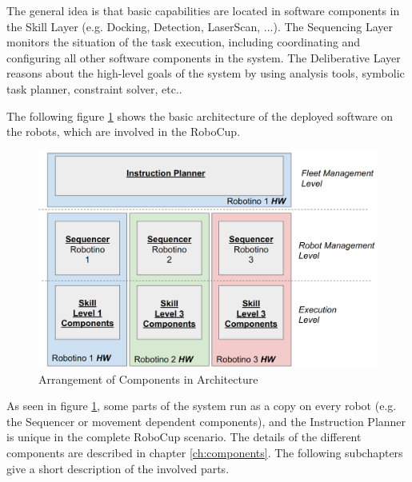 The general idea is that basic capabilities are located in software components in the Skill Layer (e.g. Docking, Detection, LaserScan, ...). The Sequencing Layer monitors the situation of the task execution, including coordinating and configuring all other software components in the system. The Deliberative Layer reasons about the high-level goals of the system by using analysis tools, symbolic task planner, constraint solver, etc..

The following figure \ref{fig:architecture_overview} shows the basic architecture of the deployed software on the robots, which are involved in the RoboCup. \\

\begin{figure}[h]
\centering
\includegraphics[scale=0.23]{pic/architecture2018.png}
\caption{Arrangement of Components in Architecture}
\label{fig:architecture_overview}
\end{figure}

As seen in figure \ref{fig:architecture_overview}, some parts of the system run as a copy on every robot (e.g. the Sequencer or movement dependent components), and the Instruction Planner is unique in the complete RoboCup scenario. The details of the different components are described in chapter \ref{ch:components}. The following subchapters give a short description of the involved parts.


